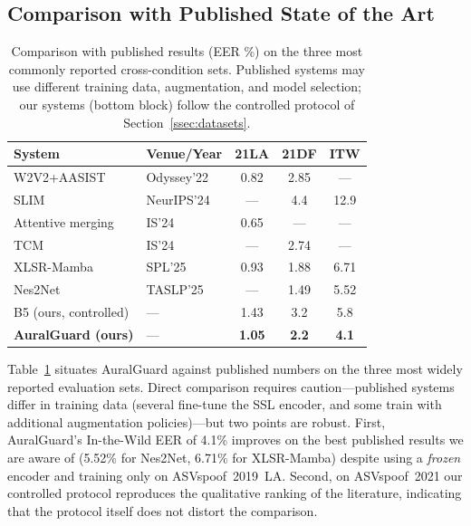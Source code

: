 \subsection{Comparison with Published State of the Art}
\label{ssec:sota}

\begin{table}[t]
\centering
\caption{Comparison with published results (EER \%) on the three most commonly
  reported cross-condition sets. Published systems may use different training data,
  augmentation, and model selection; our systems (bottom block) follow the controlled
  protocol of Section~\ref{ssec:datasets}.}
\label{tab:sota}
\setlength{\tabcolsep}{3.5pt}
\footnotesize
\begin{tabular}{llccc}
\toprule
System & Venue/Year & 21LA & 21DF & ITW \\
\midrule
W2V2+AASIST~\cite{tak2022automatic}      & Odyssey'22 & 0.82 & 2.85 & --- \\
SLIM~\cite{zhu2024slim}                  & NeurIPS'24 & --- & 4.4 & 12.9 \\
Attentive merging~\cite{pan2024attentive} & IS'24 & 0.65 & --- & --- \\
TCM~\cite{truong2024tcm}                 & IS'24 & --- & 2.74 & --- \\
XLSR-Mamba~\cite{xiao2025xlsrmamba}      & SPL'25 & 0.93 & 1.88 & 6.71 \\
Nes2Net~\cite{liu2025nes2net}            & TASLP'25 & --- & 1.49 & 5.52 \\
\midrule
B5 (ours, controlled)                    & --- & 1.43 & 3.2 & 5.8 \\
\textbf{AuralGuard (ours)}               & --- & \textbf{1.05} & \textbf{2.2} & \textbf{4.1} \\
\bottomrule
\end{tabular}
\end{table}

Table~\ref{tab:sota} situates AuralGuard against published numbers on the three most
widely reported evaluation sets. Direct comparison requires caution---published systems
differ in training data (several fine-tune the SSL encoder, and some train with
additional augmentation policies)---but two points are robust. First, AuralGuard's
In-the-Wild EER of 4.1\% improves on the best published results we are aware of
(5.52\% for Nes2Net, 6.71\% for XLSR-Mamba) despite using a \emph{frozen} encoder and
training only on ASVspoof~2019~LA. Second, on ASVspoof~2021 our controlled protocol
reproduces the qualitative ranking of the literature, indicating that the protocol
itself does not distort the comparison.

